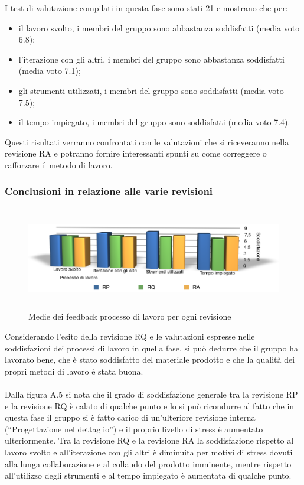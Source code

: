 \newpage
I test di valutazione compilati in questa fase sono stati 21 e mostrano che
per:
\begin{itemize}
  \item il lavoro svolto, i membri del gruppo sono abbastanza
  soddisfatti (media voto 6.8);
  \item l'iterazione con gli altri, i membri del gruppo sono
  abbastanza soddisfatti (media voto 7.1);
  \item gli strumenti utilizzati, i membri del gruppo
  sono soddisfatti (media voto 7.5);
  \item il tempo impiegato, i membri del gruppo
  sono soddisfatti (media voto 7.4).\\
\end{itemize}

Questi risultati verranno confrontati con le valutazioni che si riceveranno
nella revisione RA e potranno fornire interessanti spunti su come correggere o
rafforzare il metodo di lavoro.

\subsubsection*{Conclusioni in relazione alle varie revisioni}

\begin{figure}[htbp]
  \centering
  \includegraphics[height=4.5cm]{img/PQ/RiassuntoFeedback.png}
\caption{Medie dei feedback processo di lavoro per ogni revisione}
\end{figure}

Considerando l'esito della revisione RQ e le
valutazioni espresse nelle soddisfazioni dei processi di lavoro in quella
fase, si pu\`o dedurre che il gruppo ha lavorato bene, che \`e stato soddisfatto
del materiale prodotto e che la qualit\`a dei propri metodi di lavoro \`e stata
buona. \\ \\ 
Dalla figura A.5 si nota che il grado di soddisfazione generale tra la revisione
RP e la revisione RQ \`e calato di qualche punto e lo si pu\`o ricondurre al
fatto che in questa fase il gruppo si \`e fatto carico di un'ulteriore
revisione interna (``Progettazione nel dettaglio'') e il proprio livello di
stress \`e aumentato ulteriormente. Tra la revisione RQ e la revisione RA la
soddisfazione rispetto al lavoro svolto e all'iterazione con gli altri \`e
diminuita per motivi di stress dovuti alla lunga collaborazione e al
collaudo del prodotto imminente, mentre rispetto
all'utilizzo degli strumenti e al tempo impiegato \`e aumentata di qualche
punto.


